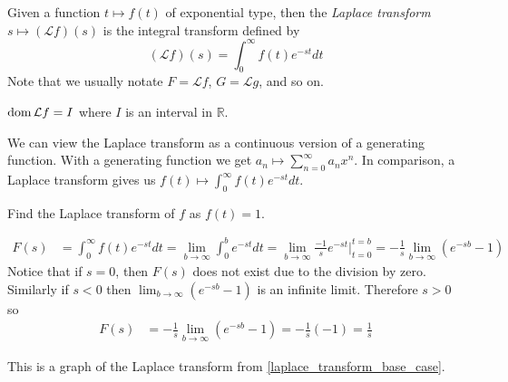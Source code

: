 \documentclass[notes]{subfiles}
\begin{document}
\begin{definition}
    Given a function $t \mapsto f(t)$ of exponential type, then the \textit{Laplace transform} $s \mapsto (\mathcal{L}f)(s)$ is the integral transform defined by
    \[
        (\mathcal{L}f)(s) = \int_0^\infty f(t)e^{-st}dt
    \]
    Note that we usually notate $F = \mathcal{L}f$, $G = \mathcal{L}g$, and so on.
\end{definition}

\begin{theorem}
    $\operatorname{dom} \mathcal{L}f = I$ where $I$ is an interval in $\mathbb{R}$.
\end{theorem}

We can view the Laplace transform as a continuous version of a generating function. With a generating function we get $a_n \mapsto \sum_{n = 0}^\infty a_n x^n$. In comparison, a Laplace transform gives us $f(t) \mapsto \int_0^\infty f(t)e^{-st}dt$.

\begin{exercise} \label{laplace_transform_base_case}
    Find the Laplace transform of $f$ as $f(t) = 1$.
\end{exercise}
\begin{solution}
    \begin{align*}
        F(s)
        &= \int_0^\infty f(t)e^{-st}dt
        = \lim_{b\to\infty} \int_0^b e^{-st}dt
        = \lim_{b\to\infty} \frac{-1}{s}e^{-st}\Big|_{t = 0}^{t = b}
        = -\frac{1}{s} \lim_{b\to\infty} (e^{-sb} - 1)
    \end{align*}
    Notice that if $s = 0$, then $F(s)$ does not exist due to the division by zero. Similarly if $s < 0$ then $\lim_{b\to\infty} (e^{-sb} - 1)$ is an infinite limit. Therefore $s > 0$ so
    \begin{align*}
        F(s)
        &= -\frac{1}{s} \lim_{b\to\infty} (e^{-sb} - 1)
        = -\frac{1}{s}(-1)
        = \frac{1}{s}
    \end{align*}
\end{solution}

This is a graph of the Laplace transform from \cref{laplace_transform_base_case}.
\end{document}
